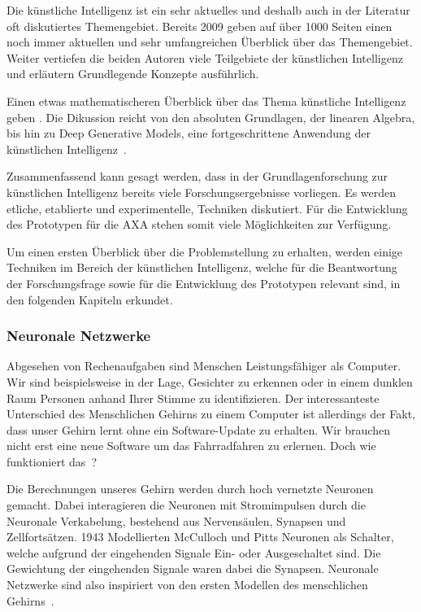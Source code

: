 \documentclass{hwz}
\begin{document}
Die künstliche Intelligenz ist ein sehr aktuelles und deshalb auch in der Literatur oft diskutiertes Themengebiet. Bereits 2009 geben \textcite{Russell2009ArtificialEdition} auf über 1000 Seiten einen noch immer aktuellen und sehr umfangreichen Überblick über das Themengebiet. Weiter vertiefen die beiden Autoren viele Teilgebiete der künstlichen Intelligenz und erläutern Grundlegende Konzepte ausführlich.

Einen etwas mathematischeren Überblick über das Thema künstliche Intelligenz geben \textcite{Goodfellow2016DeepLearning}. Die Dikussion reicht von den absoluten Grundlagen, der linearen Algebra, bis hin zu Deep Generative Models, eine fortgeschrittene Anwendung der künstlichen Intelligenz~\autocite{Goodfellow2016DeepLearning}.

Zusammenfassend kann gesagt werden, dass in der Grundlagenforschung zur künstlichen Intelligenz bereits viele Forschungsergebnisse vorliegen. Es werden etliche, etablierte und experimentelle, Techniken diskutiert. Für die Entwicklung des Prototypen für die AXA stehen somit viele Möglichkeiten zur Verfügung.

Um einen ersten Überblick über die Problemstellung zu erhalten, werden einige Techniken im Bereich der künstlichen Intelligenz, welche für die Beantwortung der Forschungsfrage sowie für die Entwicklung des Prototypen relevant sind, in den folgenden Kapiteln erkundet.

\subsubsection{Neuronale Netzwerke}

Abgesehen von Rechenaufgaben sind Menschen Leistungsfähiger als Computer. Wir sind beispielsweise in der Lage, Gesichter zu erkennen oder in einem dunklen Raum Personen anhand Ihrer Stimme zu identifizieren. Der interessanteste Unterschied des Menschlichen Gehirns zu einem Computer ist allerdings der Fakt, dass unser Gehirn lernt ohne ein Software-Update zu erhalten. Wir brauchen nicht erst eine neue Software um das Fahrradfahren zu erlernen. Doch wie funktioniert das~\autocite{Krogh2008WhatNetworks}?

Die Berechnungen unseres Gehirn werden durch hoch vernetzte Neuronen gemacht. Dabei interagieren die Neuronen mit Stromimpulsen durch die Neuronale Verkabelung, bestehend aus Nervensäulen, Synapsen und Zellfortsätzen. 1943 Modellierten McCulloch und Pitts Neuronen als Schalter, welche aufgrund der eingehenden Signale Ein- oder Ausgeschaltet sind. Die Gewichtung der eingehenden Signale waren dabei die Synapsen. Neuronale Netzwerke sind also inspiriert von den ersten Modellen des menschlichen Gehirns~\autocite{Krogh2008WhatNetworks}.
\end{document}
